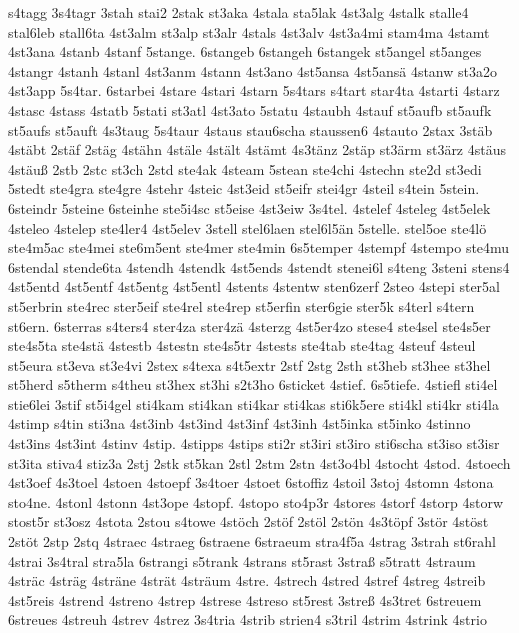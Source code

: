 {s4tagg
3s4tagr
3stah
stai2
2stak
st3aka
4stala
sta5lak
4st3alg
4stalk
stalle4
stal6leb
stall6ta
4st3alm
st3alp
st3alr
4stals
4st3alv
4st3a4mi
stam4ma
4stamt
4st3ana
4stanb
4stanf
5stange.
6stangeb
6stangeh
6stangek
st5angel
st5anges
4stangr
4stanh
4stanl
4st3anm
4stann
4st3ano
4st5ansa
4st5ansä
4stanw
st3a2o
4st3app
5s4tar.
6starbei
4stare
4stari
4starn
5s4tars
s4tart
star4ta
4starti
4starz
4stasc
4stass
4statb
5stati
st3atl
4st3ato
5statu
4staubh
4stauf
st5aufb
st5aufk
st5aufs
st5auft
4s3taug
5s4taur
4staus
stau6scha
staussen6
4stauto
2stax
3stäb
4stäbt
2stäf
2stäg
4stähn
4stäle
4stält
4stämt
4s3tänz
2stäp
st3ärm
st3ärz
4stäus
4stäuß
2stb
2stc
st3ch
2std
ste4ak
4steam
5stean
ste4chi
4stechn
ste2d
st3edi
5stedt
ste4gra
ste4gre
4stehr
4steic
4st3eid
st5eifr
stei4gr
4steil
s4tein
5stein.
6steindr
5steine
6steinhe
ste5i4sc
st5eise
4st3eiw
3s4tel.
4stelef
4steleg
4st5elek
4steleo
4stelep
ste4ler4
4st5elev
3stell
stel6laen
stel6l5än
5stelle.
stel5oe
ste4lö
ste4m5ac
ste4mei
ste6m5ent
ste4mer
ste4min
6s5temper
4stempf
4stempo
ste4mu
6stendal
stende6ta
4stendh
4stendk
4st5ends
4stendt
stenei6l
s4teng
3steni
stens4
4st5entd
4st5entf
4st5entg
4st5entl
4stents
4stentw
sten6zerf
2steo
4stepi
ster5al
st5erbrin
ste4rec
ster5eif
ste4rel
ste4rep
st5erfin
ster6gie
ster5k
s4terl
s4tern
st6ern.
6sterras
s4ters4
ster4za
ster4zä
4sterzg
4st5er4zo
stese4
ste4sel
ste4s5er
ste4s5ta
ste4stä
4stestb
4stestn
ste4s5tr
4stests
ste4tab
ste4tag
4steuf
4steul
st5eura
st3eva
st3e4vi
2stex
s4texa
s4t5extr
2stf
2stg
2sth
st3heb
st3hee
st3hel
st5herd
s5therm
s4theu
st3hex
st3hi
s2t3ho
6sticket
4stief.
6s5tiefe.
4stiefl
sti4el
stie6lei
3stif
st5i4gel
sti4kam
sti4kan
sti4kar
sti4kas
sti6k5ere
sti4kl
sti4kr
sti4la
4stimp
s4tin
sti3na
4st3inb
4st3ind
4st3inf
4st3inh
4st5inka
st5inko
4stinno
4st3ins
4st3int
4stinv
4stip.
4stipps
4stips
sti2r
st3iri
st3iro
sti6scha
st3iso
st3isr
st3ita
stiva4
stiz3a
2stj
2stk
st5kan
2stl
2stm
2stn
4st3o4bl
4stocht
4stod.
4stoech
4st3oef
4s3toel
4stoen
4stoepf
3s4toer
4stoet
6stoffiz
4stoil
3stoj
4stomn
4stona
sto4ne.
4stonl
4stonn
4st3ope
4stopf.
4stopo
sto4p3r
4stores
4storf
4storp
4storw
stost5r
st3osz
4stota
2stou
s4towe
4stöch
2stöf
2stöl
2stön
4s3töpf
3stör
4stöst
2stöt
2stp
2stq
4straec
4straeg
6straene
6straeum
stra4f5a
4strag
3strah
st6rahl
4strai
3s4tral
stra5la
6strangi
s5trank
4strans
st5rast
3straß
s5tratt
4straum
4sträc
4sträg
4sträne
4strät
4sträum
4stre.
4strech
4stred
4stref
4streg
4streib
4st5reis
4strend
4streno
4strep
4strese
4streso
st5rest
3streß
4s3tret
6streuem
6streues
4streuh
4strev
4strez
3s4tria
4strib
strien4
s3tril
4strim
4strink
4strio
}
